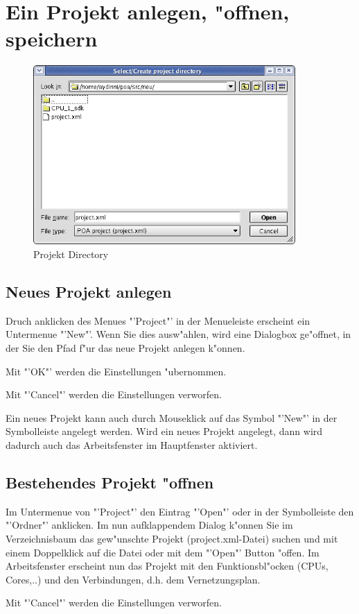\documentclass[a4paper,titlepage,12pt,ngerman]{scrbook}
\begin{document}
\section{Ein Projekt anlegen, "offnen, speichern}
\begin{figure}[htbp]
\begin{center}
\includegraphics[width=10cm]{Directory}
\caption{Projekt Directory}\label{test}
\end{center}
\end{figure}

\subsection{Neues Projekt anlegen}
Druch anklicken des Menues "'Project"' in der Menueleiste erscheint ein Untermenue "'New"'. Wenn Sie dies ausw"ahlen, wird eine Dialogbox ge"offnet, in der Sie den Pfad f"ur das neue Projekt anlegen k"onnen.\par
Mit "'OK"' werden die Einstellungen "ubernommen.\par
Mit "'Cancel"' werden die Einstellungen verworfen.\par
Ein neues Projekt kann auch durch Mouseklick auf das Symbol "'New"' in der Symbolleiste angelegt werden.
Wird ein neues Projekt angelegt, dann wird dadurch auch das Arbeitsfenster im Hauptfenster aktiviert.

\subsection{Bestehendes Projekt "offnen}
Im Untermenue von "'Project"' den Eintrag "'Open"' oder in der Symbolleiste den "'Ordner"' anklicken. Im nun aufklappendem Dialog k"onnen Sie im Verzeichnisbaum das gew"unschte Projekt (project.xml-Datei) suchen und mit einem Doppelklick auf die Datei oder mit dem "'Open"' Button "offen.
Im Arbeitsfenster erscheint nun das Projekt mit den Funktionsbl"ocken (CPUs, Cores,..) und den Verbindungen, d.h. dem Vernetzungsplan.\par
Mit "'Cancel"' werden die Einstellungen verworfen.\par
\end{document}
